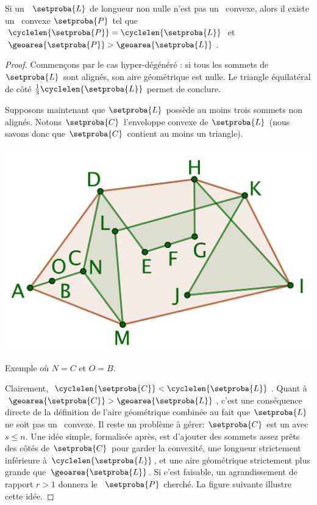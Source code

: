 \begin{fact} \label{max-is-conv}
    Si un \ncycle\ $\setproba{L}$ de longueur non nulle n'est pas un \ngone\ convexe, alors il existe un \ngone\ convexe $\setproba{P}$ tel que
	$\cyclelen{\setproba{P}} = \cyclelen{\setproba{L}}$
	et
	$\geoarea{\setproba{P}} > \geoarea{\setproba{L}}$.
\end{fact}


\begin{proof}
	Commençons par le cas \og hyper-dégénéré \fg: si tous les sommets de $\setproba{L}$ sont alignés, son aire géométrique est nulle. Le triangle équilatéral de côté $\frac13 \cyclelen{\setproba{L}}$ permet de conclure.
	
	Supposons maintenant que $\setproba{L}$ possède au moins trois sommets non alignés.
	Notons $\setproba{C}$ l'enveloppe convexe de $\setproba{L}$ (nous savons donc que $\setproba{C}$ contient au moins un triangle).
	
	\begin{center}
		\centering
		\small\itshape
		\includegraphics[scale=.45]{content/polygon/sol-is/convex-hull.png}
		
		\smallskip
		Exemple où $N = C$ et $O = B$.
	\end{center}
	
		
	Clairement, $\cyclelen{\setproba{C}} < \cyclelen{\setproba{L}}$.
	Quant à $\geoarea{\setproba{C}} > \geoarea{\setproba{L}}$, c'est une conséquence directe de la définition de l'aire géométrique combinée au fait que $\setproba{L}$ ne soit pas un \ngone\ convexe.
	Il reste un problème à gérer: $\setproba{C}$ est un  avec $s \leq n$. 
	Une idée simple, formalisée après, est d'ajouter des sommets assez prêts des côtés de $\setproba{C}$ pour garder la convexité, une longueur strictement inférieure à $\cyclelen{\setproba{L}}$, et une aire géométrique strictement plus grande que $\geoarea{\setproba{L}}$. Si c'est faisable, un agrandissement de rapport $r > 1$ donnera le \ngone\ $\setproba{P}$ cherché.
	La figure suivante illustre cette idée.


\end{proof}
